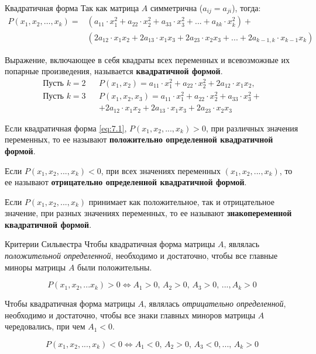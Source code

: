 \begin{tbox}{Квадратичная форма}
	Так как матрица $A$ симметрична ($a_{ij} = a_{ji}$), тогда:
	\begin{equation} \label{eq:7.1}
		\begin{aligned}
			P(x_1, x_2, \dots, x_k) = &(a_{11} \cdot x_{1}^2 + a_{22} \cdot x_{2}^2 + a_{33} \cdot x_{3}^2 + ... + a_{kk} \cdot x_k^2) + \\
			&(2 a_{12} \cdot x_1 x_2 + 2 a_{13} \cdot x_1 x_3 + 2 a_{23} \cdot x_2 x_3 + ... + 2 a_{k - 1, k} \cdot x_{k-1} x_{k})
		\end{aligned}
	\end{equation}

	Выражение, включающее в себя квадраты всех переменных и всевозможные их попарные произведения, называется \textbf{квадратичной формой}.
	\begin{align*}
		\text{Пусть $k = 2$} && P(x_1, x_2) = a_{11} \cdot x_1^2 + a_{22} \cdot x_2^2 + 2 a_{12} \cdot x_1 x_2,\\
		\text{Пусть $k = 3$} && P(x_1, x_2, x_3) = a_{11} \cdot x_1^2 + a_{22} \cdot x_2^2 + a_{33} \cdot x_3^2 + \\&&+ 2 a_{12} \cdot x_1 x_2 + 2 a_{13} \cdot x_1 x_3 + 2 a_{23} \cdot x_2 x_3
	\end{align*}

	Если квадратичная форма \eqref{eq:7.1}, $P(x_1, x_2, ..., x_k) > 0$, при различных значения переменных, то ее называют \textbf{положительно определенной квадратичной формой}.

	Если $P(x_1, x_2, ..., x_k) < 0$, при всех значениях переменных $(x_1, x_2, ..., x_k)$, то ее называют \textbf{отрицательно определенной квадратичной формой}.

	Если $P(x_1, x_2, ..., x_k)$ принимает как положительное, так и отрицательное значение, при разных значениях переменных, то ее называют \textbf{знакопеременной квадратичной формой}.
\end{tbox}

\begin{tbox}{Критерии Сильвестра}
	Чтобы квадратичная форма матрицы $A$, являлась \textit{положительной определенной}, необходимо и достаточно, чтобы все главные миноры матрицы $A$ были положительны.

	\begin{equation*}
		P(x_1, x_2, ... x_k) > 0  \Leftrightarrow A_1 > 0, \, A_2 > 0, \, A_3 > 0, \, ...,A_k>0
	\end{equation*}

	Чтобы квадратичная форма матрицы $A$, являлась \textit{отрицательно определенной}, необходимо и достаточно, чтобы все знаки главных миноров матрицы $A$ чередовались, при чем $A_1 < 0$.

	\begin{equation*}
		P(x_1, x_2, ..., x_k) < 0 \Leftrightarrow A_1 < 0, \, A_2 > 0, \, A_3 < 0, ..., \, A_k > 0
	\end{equation*}
\end{tbox}

